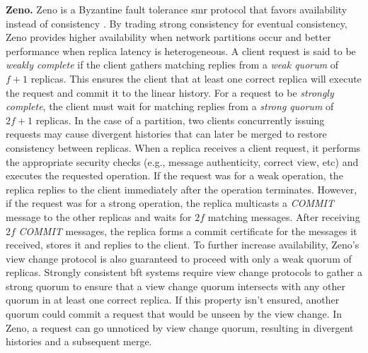 \textbf{Zeno.} Zeno is a Byzantine fault tolerance \acrshort{smr} protocol that favors availability instead of consistency \cite{Singh2009}. By trading strong consistency for eventual consistency, Zeno provides higher availability when network partitions occur and better performance when replica latency is heterogeneous.  A client request is said to be \textit{weakly complete} if the client gathers matching replies from a \textit{weak quorum} of $f+1$ replicas. This ensures the client that at least one correct replica will execute the request and commit it to the linear history. For a request to be \textit{strongly complete}, the client must wait for matching replies from a \textit{strong quorum} of $2f+1$ replicas. In the case of a partition, two clients concurrently issuing requests may cause divergent histories that can later be merged to restore consistency between replicas. When a replica receives a client request, it performs the appropriate security checks (e.g., message authenticity, correct view, etc) and executes the requested operation. If the request was for a weak operation, the replica replies to the client immediately after the operation terminates. However, if the request was for a strong operation, the replica multicasts a \textit{COMMIT} message to the other replicas and waits for $2f$ matching messages. After receiving $2f$ \textit{COMMIT} messages, the replica forms a commit certificate for the messages it received, stores it and replies to the client. To further increase availability, Zeno's view change protocol is also guaranteed to proceed with only a weak quorum of replicas. Strongly consistent \acrshort{bft} systems require view change protocols to gather a strong quorum to ensure that a view change quorum intersects with any other quorum in at least one correct replica. If this property isn't ensured, another quorum could commit a request that would be unseen by the view change. In Zeno, a request can go unnoticed by view change quorum, resulting in divergent histories and a subsequent merge. \par
